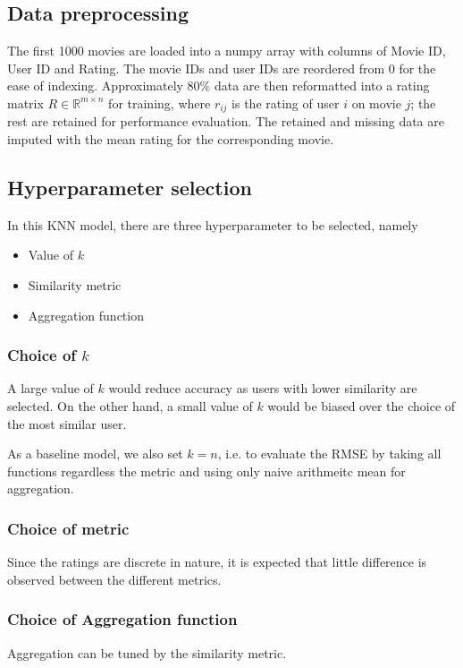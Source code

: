 \documentclass[final]{cvpr}
\begin{document}
\subsection{Data preprocessing}
The first 1000 movies are loaded into a numpy array with columns of Movie ID, User ID and Rating.
The movie IDs and user IDs are reordered from 0 for the ease of indexing.
Approximately $80\%$ data are then reformatted into a rating matrix $R \in \mathbb R^{m \times n}$ for training,
where $r_{ij}$ is the rating of user $i$ on movie $j$;
the rest are retained for performance evaluation.
The retained and missing data are imputed with the mean rating for the corresponding movie.

\subsection{Hyperparameter selection}
In this KNN model, there are three hyperparameter to be selected, namely
\begin{itemize}
	\item Value of $k$
	\item Similarity metric
	\item Aggregation function
\end{itemize}

\subsubsection{Choice of $k$}
A large value of $k$ would reduce accuracy as users with lower similarity are selected.
On the other hand, a small value of $k$ would be biased over the choice of the most similar user.

As a baseline model, we also set $k=n$, i.e.
to evaluate the RMSE by taking all functions regardless the metric and using only naive arithmeitc mean for aggregation.


\subsubsection{Choice of metric}
Since the ratings are discrete in nature, it is expected that little difference is observed between the different metrics.

\subsubsection{Choice of Aggregation function}
Aggregation can be tuned by the similarity metric.
\end{document}
